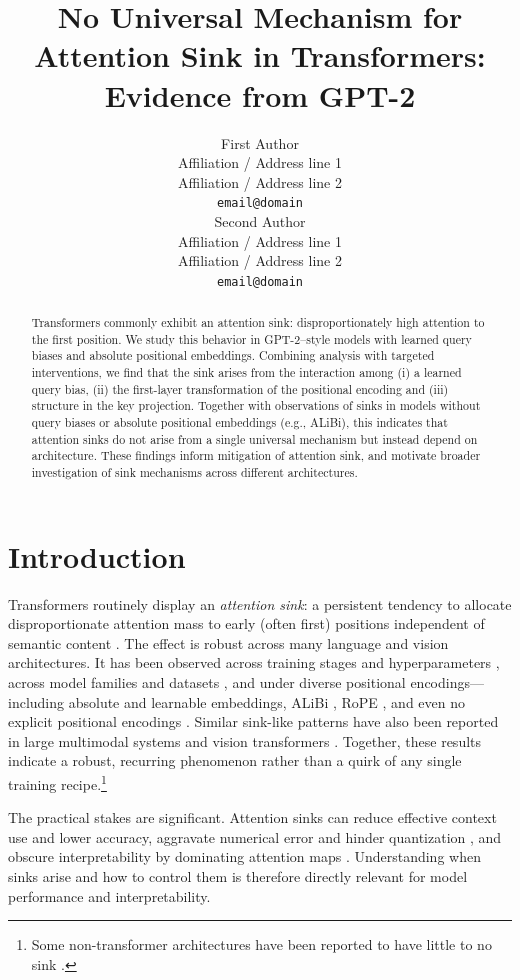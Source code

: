 \documentclass[11pt]{article}
\title{No Universal Mechanism for Attention Sink in Transformers: \\Evidence from GPT-2}
\author{First Author \\
  Affiliation / Address line 1 \\
  Affiliation / Address line 2 \\
  \texttt{email@domain} \\\And
  Second Author \\
  Affiliation / Address line 1 \\
  Affiliation / Address line 2 \\
  \texttt{email@domain} \\
}
\date{}
\begin{document}
\maketitle

\begin{abstract}
  Transformers commonly exhibit an attention sink: disproportionately high attention to the first position. We study this behavior in GPT-2–style models with learned query biases and absolute positional embeddings. Combining analysis with targeted interventions, we find that the sink arises from the interaction among (i) a learned query bias, (ii) the first-layer transformation of the positional encoding and (iii) structure in the key projection. Together with observations of sinks in models without query biases or absolute positional embeddings (e.g., ALiBi), this indicates that attention sinks do not arise from a single universal mechanism but instead depend on architecture. These findings inform mitigation of attention sink, and motivate broader investigation of sink mechanisms across different architectures.
\end{abstract}

\section{Introduction}\label{sec:intro}

Transformers \cite{vaswani2023attentionneed} routinely display an \emph{attention sink}: a persistent tendency to allocate disproportionate attention mass to early (often first) positions independent of semantic content \citep{xiao2023efficient,gu2025when}. The effect is robust across many language and vision architectures. It has been observed across training stages and hyperparameters \citep{gu2025when,Guo2024ActiveDormantAH}, across model families and datasets \citep{xiao2023efficient}, and under diverse positional encodings—including absolute and learnable embeddings, ALiBi \citep{press2021train}, RoPE \citep{su2021roformer}, and even no explicit positional encodings \citep{gu2025when}. Similar sink-like patterns have also been reported in large multimodal systems and vision transformers \citep{Kang2025See,wang2025mirage,Feng2025EDIT:}. Together, these results indicate a robust, recurring phenomenon rather than a quirk of any single training recipe.\footnote{Some non-transformer architectures have been reported to have little to no sink \citep{endy-etal-2025-mamba}.}

The practical stakes are significant. Attention sinks can reduce effective context use and lower accuracy\citep{Yu2024Unveiling,Guo2024ActiveDormantAH}, aggravate numerical error and hinder quantization \citep{sun2024massive,lin2024duquant}, and obscure interpretability by dominating attention maps \citep{Guo2024ActiveDormantAH}. Understanding when sinks arise and how to control them is therefore directly relevant for model performance and interpretability.
\end{document}
